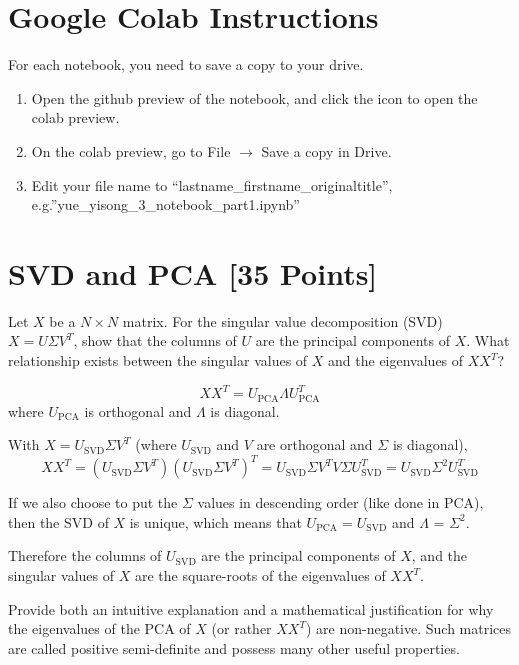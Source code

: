 \section*{Google Colab Instructions}

For each notebook, you need to save a copy to your drive.

\begin{enumerate}
	\item Open the github preview of the notebook, and click the icon to open the colab preview.
	\item On the colab preview, go to File $\rightarrow$ Save a copy in Drive.
	\item Edit your file name to “lastname_firstname_originaltitle”, e.g.”yue_yisong_3_notebook_part1.ipynb”
\end{enumerate}


\newpage
\section{SVD and PCA [35 Points]}

\problem[3] Let $X$ be a $N \times N$ matrix. For the singular value decomposition (SVD) $X = U \Sigma V^T$, show that the columns of $U$ are the principal components of $X$. What relationship exists between the singular values of $X$ and the eigenvalues of $XX^T$?

\begin{solution}
	$$ X X^T = U_\text{PCA} \Lambda U_\text{PCA}^T $$
	where $U_\text{PCA}$ is orthogonal and $\Lambda$ is diagonal.

	With $X = U_\text{SVD} \Sigma V^T$ (where $U_\text{SVD}$ and $V$ are orthogonal and $\Sigma$ is diagonal),
	$$
	X X^T =
	\left( U_\text{SVD} \Sigma V^T \right)\left( U_\text{SVD} \Sigma V^T \right)^T =
	U_\text{SVD} \Sigma V ^T V \Sigma U_\text{SVD}^T = U_\text{SVD} \Sigma^2 U_\text{SVD}^T
	$$

	If we also choose to put the $\Sigma$ values in descending order (like done in PCA), then the SVD of $X$ is unique, which means that $U_\text{PCA} = U_\text{SVD}$ and $\Lambda$ = $\Sigma^2$.

	Therefore the columns of $U_\text{SVD}$ are the principal components of $X$, and the singular values of $X$ are the square-roots of the eigenvalues of $X X^T$.
\end{solution}

\problem[4] Provide both an intuitive explanation and a mathematical justification for why the eigenvalues of the PCA of $X$ (or rather $XX^T$) are non-negative. Such matrices are called positive semi-definite and possess many other useful properties.

